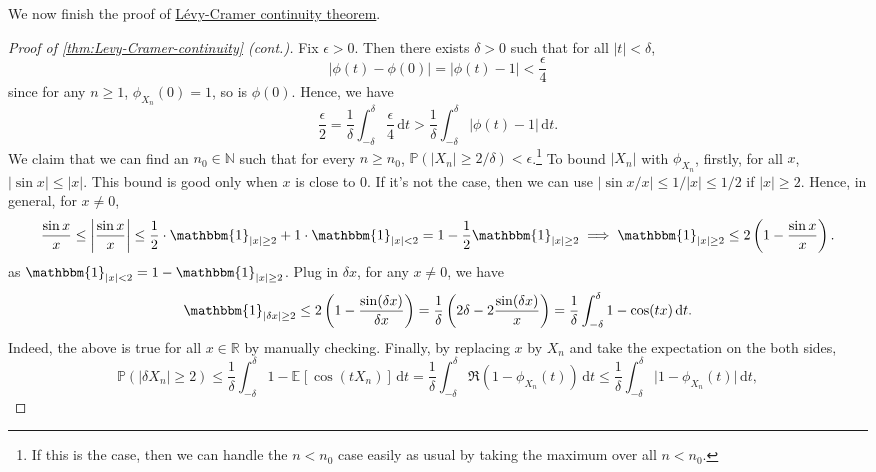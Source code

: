 We now finish the proof of \hyperref[thm:Levy-Cramer-continuity]{Lévy-Cramer continuity theorem}.

\begin{proof}[Proof of \autoref{thm:Levy-Cramer-continuity} (cont.)]\label{pf:thm:Levy-Cramer-continuity}
	Fix \(\epsilon > 0\). Then there exists \(\delta > 0\) such that for all \(\vert t \vert < \delta \),
	\[
		\vert \phi (t) - \phi (0) \vert
		= \vert \phi (t) - 1 \vert
		< \frac{\epsilon }{4}
	\]
	since for any \(n \geq 1\), \(\phi _{X_n}(0) = 1\), so is \(\phi (0)\). Hence, we have
	\[
		\frac{\epsilon }{2}
		= \frac{1}{\delta } \int_{-\delta }^{\delta } \frac{\epsilon }{4} \,\mathrm{d}t
		> \frac{1}{\delta } \int_{-\delta }^{\delta } \vert \phi (t) - 1 \vert \,\mathrm{d}t .
	\]
	We claim that we can find an \(n_0 \in \mathbb{N} \) such that for every \(n \geq n_0\), \(\mathbb{P} (\vert X_n \vert \geq 2 / \delta ) < \epsilon \).\footnote{If this is the case, then we can handle the \(n < n_0\) case easily as usual by taking the maximum over all \(n < n_0\).} To bound \(\vert X_n \vert \) with \(\phi _{X_n}\), firstly, for all \(x\), \(\vert \sin x \vert \leq \vert x \vert \). This bound is good only when \(x\) is close to \(0\). If it's not the case, then we can use \(\vert \sin x / x \vert \leq 1 / \vert x \vert \leq 1 / 2\) if \(\vert x \vert \geq 2\). Hence, in general, for \(x \neq 0\),
	\[
		\frac{\sin x}{x}
		\leq \left\vert \frac{\sin x}{x} \right\vert
		\leq \frac{1}{2} \cdot \mathbbm{1}_{\vert x \vert \geq 2} + 1 \cdot \mathbbm{1}_{\vert x \vert < 2}
		= 1 - \frac{1}{2} \mathbbm{1}_{\vert x \vert \geq 2}
		\implies \mathbbm{1}_{\vert x \vert \geq 2}
		\leq 2 \left( 1 - \frac{\sin x}{x} \right).
	\]
	as \(\mathbbm{1}_{\vert x \vert < 2} = 1 - \mathbbm{1}_{\vert x \vert \geq 2} \). Plug in \(\delta x\), for any \(x \neq 0\), we have
	\[
		\mathbbm{1}_{\vert \delta x \vert \geq 2}
		\leq 2 \left( 1 - \frac{\sin (\delta x)}{\delta x} \right)
		= \frac{1}{\delta } \left( 2\delta - 2 \frac{\sin (\delta x)}{x} \right)
		= \frac{1}{\delta } \int_{-\delta }^{\delta } 1 - \cos (tx) \,\mathrm{d}t .
	\]
	Indeed, the above is true for all \(x \in \mathbb{R} \) by manually checking. Finally, by replacing \(x\) by \(X_n\) and take the expectation on the both sides,
	\[
		\mathbb{P} (\vert \delta X_n \vert \geq 2)
		\leq \frac{1}{\delta } \int_{-\delta }^{\delta } 1 - \mathbb{E}_{}[\cos (t X_n)] \,\mathrm{d}t
		= \frac{1}{\delta } \int_{-\delta }^{\delta } \Re (1 - \phi _{X_n}(t)) \,\mathrm{d}t
		\leq \frac{1}{\delta } \int_{-\delta }^{\delta } \vert 1 - \phi _{X_n}(t) \vert  \,\mathrm{d}t,
\]
\end{proof}
